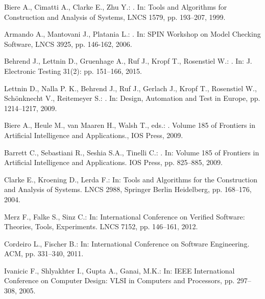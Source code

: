 \documentclass{acm_sen_article}
\begin{document}
\begin{thebibliography}{1}
Biere A., Cimatti A., Clarke E., Zhu Y.:
. 
\newblock In: Tools and Algorithms for Construction and Analysis of Systems, LNCS 1579, pp. 193--207, 1999.

Armando A., Mantovani J., Platania L.:
. 
\newblock In: {SPIN} Workshop on Model Checking Software, LNCS 3925, pp. 146-162, 2006.

Behrend J., Lettnin D., Gruenhage A., Ruf J., Kropf T., Rosenstiel W.:
. 
\newblock In: J. Electronic Testing 31(2): pp. 151--166, 2015.

Lettnin D., Nalla P. K., Behrend J., Ruf J., Gerlach J., Kropf T., Rosenstiel W., Sch{\"o}nknecht V., Reitemeyer S.:
. 
\newblock In: Design, Automation and Test in Europe, pp. 1214--1217, 2009.

Biere A., Heule M., van Maaren H., Walsh T., eds.:
.
\newblock Volume 185 of Frontiers in Artificial Intelligence and Applications., {IOS} Press, 2009.

Barrett C., Sebastiani R., Seshia S.A., Tinelli C.:
. 
\newblock In: Volume 185 of Frontiers in Artificial Intelligence and Applications. IOS Press, pp. 825--885, 2009.

Clarke E., Kroening D., Lerda F.:
\newblock In: Tools and Algorithms for the Construction and Analysis of Systems. LNCS 2988, Springer Berlin Heidelberg,  pp. 168--176, 2004.

Merz F., Falke S., Sinz C.:
\newblock In: International Conference on Verified Software: Theories, Tools, Experiments. LNCS 7152, pp. 146--161, 2012.

Cordeiro L., Fischer B.:
\newblock In: International Conference on Software Engineering. ACM,  pp. 331--340, 2011.

Ivanicic F., Shlyakhter I., Gupta A., Ganai, M.K.:
\newblock In: IEEE International Conference on Computer Design: VLSI in Computers and Processors, pp. 297--308, 2005.


\end{thebibliography}
\end{document}
